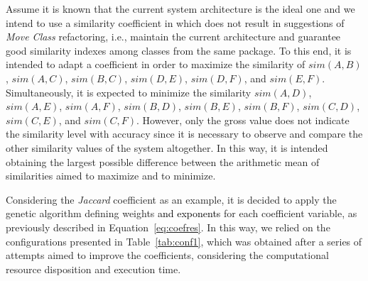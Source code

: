 \documentclass[smallextended,natbib]{svjour3}
\begin{document}
{Assume it is known that the current system architecture is the ideal one and we intend to use a similarity coefficient in which does not result in suggestions of \textit{Move Class} refactoring, i.e., maintain the current architecture and guarantee good similarity indexes among classes from the same package. To this end, it is intended to adapt a coefficient in order to maximize the similarity of $sim(A,B)$, $sim(A,C)$, $sim(B, C)$, $sim(D,E)$, $sim(D,F)$, and $sim(E,F)$. Simultaneously, it is expected to minimize the similarity $sim(A,D)$, $sim(A,E)$, $sim(A,F)$, $sim(B,D)$, $sim(B,E)$, $sim(B,F)$, $sim(C,D)$, $sim(C,E)$, and $sim(C,F)$. However, only the gross value does not indicate the similarity level with accuracy since it is necessary to observe and compare the other similarity values of the system altogether. In this way, it is intended obtaining the largest possible difference between the arithmetic mean of similarities aimed to maximize and to minimize.

Considering the \textit{Jaccard} coefficient as an example, it is decided to apply the genetic algorithm defining weights \textcolor{black}{and exponents} for each coefficient variable, as previously described in Equation~\ref{eq:coefres}. In this way, we relied on the configurations presented in Table~\ref{tab:conf1}, which was obtained after a series of attempts aimed to improve the coefficients, considering the computational resource disposition and execution time.

}
\end{document}

